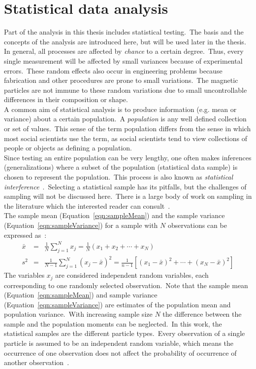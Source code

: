 \section{Statistical data analysis}\label{s:statisticalInference}
Part of the analysis in this thesis includes statistical testing.\ The basis and the concepts of the analysis are introduced here, but will be used later in the thesis.\\
In general, all processes are affected by \textit{chance} to a certain degree.\ Thus, every single measurement will be affected by small variances because of experimental errors.\ These random effects also occur in engineering problems because fabrication and other procedures are prone to small variations.\ The magnetic particles are not immune to these random variations due to small uncontrollable differences in their composition or shape.\\
A common aim of statistical analysis is to produce information (e.g. mean or variance) about a certain population.\ A \textit{population} is any well defined collection or set of values.\ This sense of the term population differs from the sense in which most social scientists use the term, as social scientists tend to view collections of people or objects as defining a population.\\
Since testing an entire population can be very lengthy, one often makes inferences (generalizations) where a subset of the population (statistical data sample) is chosen to represent the population.\ This process is also known as \textit{statistical interference}~\cite{Peck2015}.\ Selecting a statistical sample has its pitfalls, but the challenges of sampling will not be discussed here.\ There is a large body of work on sampling in the literature which the interested reader can consult~\cite{Peck2015,Box1978,Rosenbaum1985,Silverman1986}.\\
The sample mean (Equation~\ref{eqn:sampleMean}) and the sample variance (Equation~\ref{eqn:sampleVariance}) for a sample with $N$ observations can be expressed as~\cite{Peck2015}:\
\begin{eqnarray}
	\bar{x} &=& \frac{1}{N}\sum_{j=1}^{N}x_{j} = \frac{1}{N}(x_{1}+x_{2}+ \cdots + x_{N})
	\label{eqn:sampleMean} \\
	s^{2} &=& \frac{1}{N-1}\sum_{j=1}^{N}(x_{j}-\bar{x})^{2} = \frac{1}{n-1}\left[(x_{1}-\bar{x})^{2}+\cdots+(x_{N}-\bar{x})^{2}\right]
	\label{eqn:sampleVariance}
\end{eqnarray}
The variables $x_{j}$ are considered independent random variables, each corresponding to one randomly selected observation.\ Note that the sample mean (Equation~\ref{eqn:sampleMean}) and sample variance (Equation~\ref{eqn:sampleVariance}) are estimates of the population mean and population variance.\ With increasing sample size $N$ the difference between the sample and the population moments can be neglected.\ In this work, the statistical samples are the different particle types.\ Every observation of a single particle is assumed to be an independent random variable, which means the occurrence of one observation does not affect the probability of occurrence of another observation~\cite{Hogg1995}.\
%
